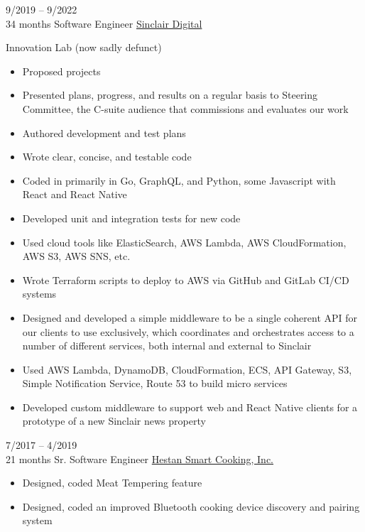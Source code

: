 \documentclass[9pt]{developercv} %
\begin{document}
\begin{entrylist}
	\entry
        {9/2019 -- 9/2022 \\\footnotesize{34 months}}
		{Software Engineer}
		{\href{https://sinclairdigital.com/}{Sinclair Digital}}
		{
        Innovation Lab (now sadly defunct)
        \begin{itemize}[noitemsep,topsep=0pt,parsep=0pt,partopsep=0pt, leftmargin=-1pt]
            \item Proposed projects
            \item Presented plans, progress, and results on a regular basis to Steering Committee, the C-suite audience that commissions and evaluates our work
            \item Authored development and test plans
            \item Wrote clear, concise, and testable code
            \item Coded in primarily in Go, GraphQL, and Python, some Javascript with React and React Native
            \item Developed unit and integration tests for new code
            \item Used cloud tools like ElasticSearch, AWS Lambda, AWS CloudFormation, AWS S3, AWS SNS, etc.
            \item Wrote Terraform scripts to deploy to AWS via GitHub and GitLab CI/CD systems
            \item Designed and developed a simple middleware to be a single coherent API for our clients to use exclusively, which coordinates and orchestrates access to a number of different services, both internal and external to Sinclair
            \item Used AWS Lambda, DynamoDB, CloudFormation, ECS, API Gateway, S3, Simple Notification Service, Route 53 to build micro services
            \item Developed custom middleware to support web and React Native clients for a prototype of a new Sinclair news property
        \end{itemize}
        }
	\entry
        {7/2017 -- 4/2019 \\\footnotesize{21 months}}
		{Sr. Software Engineer}
		{\href{https://hestancue.com/}{Hestan Smart Cooking, Inc.}}
		{\vspace{-10pt}
        \begin{itemize}[noitemsep,topsep=0pt,parsep=0pt,partopsep=0pt, leftmargin=-1pt]
            \item Designed, coded Meat Tempering feature
            \item Designed, coded an improved Bluetooth cooking device discovery and pairing system

\end{itemize}}
\end{entrylist}
\end{document}

